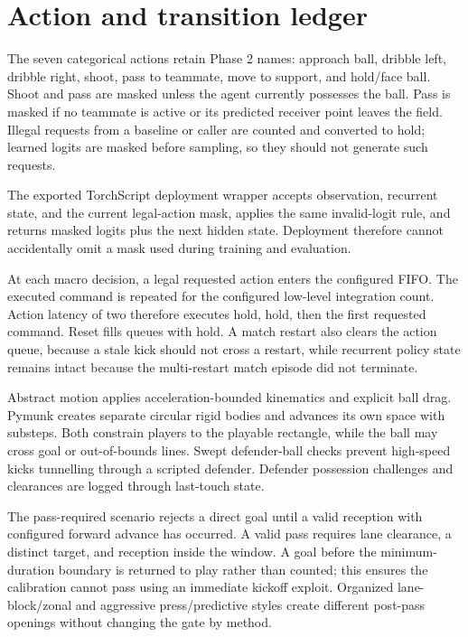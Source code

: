\documentclass[12pt,twocolumn]{article}
\begin{document}
\section{Action and transition ledger}
The seven categorical actions retain Phase 2 names: approach ball, dribble left, dribble right,
shoot, pass to teammate, move to support, and hold/face ball. Shoot and pass are masked unless the
agent currently possesses the ball. Pass is masked if no teammate is active or its predicted
receiver point leaves the field. Illegal requests from
a baseline or caller are counted and converted to hold; learned logits are masked before sampling,
so they should not generate such requests.

The exported TorchScript deployment wrapper accepts observation, recurrent state, and the current
legal-action mask, applies the same invalid-logit rule, and returns masked logits plus the next
hidden state. Deployment therefore cannot accidentally omit a mask used during training and
evaluation.

At each macro decision, a legal requested action enters the configured FIFO. The executed command
is repeated for the configured low-level integration count. Action latency of two therefore
executes hold, hold, then the first requested command. Reset fills queues with hold. A match restart
also clears the action queue, because a stale kick should not cross a restart, while recurrent
policy state remains intact because the multi-restart match episode did not terminate.

Abstract motion applies acceleration-bounded kinematics and explicit ball drag. Pymunk creates
separate circular rigid bodies and advances its own space with substeps. Both constrain players to
the playable rectangle, while the ball may cross goal or out-of-bounds lines. Swept defender-ball
checks prevent high-speed kicks tunnelling through a scripted defender. Defender possession
challenges and clearances are logged through last-touch state.

The pass-required scenario rejects a direct goal until a valid reception with configured forward
advance has occurred. A valid pass requires lane clearance, a distinct target, and reception inside
the window. A goal before the minimum-duration boundary is returned to play rather than counted;
this ensures the calibration cannot pass using an immediate kickoff exploit. Organized
lane-block/zonal and aggressive press/predictive styles create different post-pass openings without
changing the gate by method.
\end{document}
